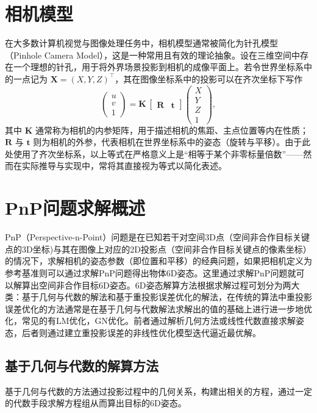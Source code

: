 \section{相机模型}
在大多数计算机视觉与图像处理任务中，相机模型通常被简化为针孔模型（Pinhole Camera Model），这是一种常用且有效的理论抽象。设在三维空间中存在一个理想的针孔，用于将外界场景投影到相机的成像平面上。若令世界坐标系中的一点记为 $\mathbf{X} = (X, Y, Z)^\top$，其在图像坐标系中的投影可以在齐次坐标下写作
\begin{equation}
	\begin{pmatrix}
		u \\ v \\ 1
	\end{pmatrix}
	=
	\mathbf{K}\,\begin{bmatrix}
		\mathbf{R} & \mathbf{t}
	\end{bmatrix}
	\begin{pmatrix}
		X \\ Y \\ Z \\ 1
	\end{pmatrix},
\end{equation}
其中 $\mathbf{K}$ 通常称为相机的内参矩阵，用于描述相机的焦距、主点位置等内在性质；$\mathbf{R}$ 与 $\mathbf{t}$ 则为相机的外参，代表相机在世界坐标系中的姿态（旋转与平移）。由于此处使用了齐次坐标系，以上等式在严格意义上是“相等于某个非零标量倍数”——然而在实际推导与实现中，常将其直接视为等式以简化表述。



\section{PnP问题求解概述}
PnP（Perspective-n-Point）问题是在已知若干对空间3D点（空间非合作目标关键点的3D坐标)与其在图像上对应的2D投影点（空间非合作目标关键点的像素坐标）的情况下，求解相机的姿态参数（即位置和平移）的经典问题，如果把相机定义为参考基准则可以通过求解PnP问题得出物体6D姿态。这里通过求解PnP问题就可以解算出空间非合作目标6D姿态。6D姿态解算方法根据求解过程可划分为两大类：基于几何与代数的解法\cite{p3p, EPnP}和基于重投影误差优化的解法\cite{Chen_2022_CVPR,Lipson_2022_CVPR,hu2022perspective}，在传统的算法中重投影误差优化的方法通常是在基于几何与代数解法求解出的值的基础上进行进一步地优化，常见的有LM优化，GN优化。前者通过解析几何方法或线性代数直接求解姿态，后者则通过建立重投影误差的非线性优化模型迭代逼近最优解。
\subsection{基于几何与代数的解算方法}
基于几何与代数的方法通过投影过程中的几何关系，构建出相关的方程，通过一定的代数手段求解方程组从而算出目标的6D姿态。
